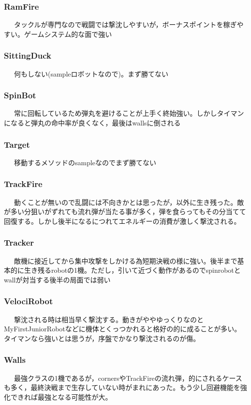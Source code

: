 \documentclass[12pt]{jarticle} %
\begin{document}
\begin{flushleft}
 \subsubsection{RamFire}
 \ \ \ タックルが専門なので戦闘では撃沈しやすいが，ボーナスポイントを稼ぎやすい。ゲームシステム的な面で強い
 
 \subsubsection{SittingDuck}
 \ \ \ 何もしない(sampleロボットなので)。まず勝てない
 
 \subsubsection{SpinBot}
 \ \ \ 常に回転しているため弾丸を避けることが上手く終始強い。しかしタイマンになると弾丸の命中率が良くなく，最後はwallsに倒される
 
 \subsubsection{Target}
 \ \ \ 移動するメソッドのsampleなのでまず勝てない
 
 \subsubsection{TrackFire}
 \ \ \ 動くことが無いので乱闘には不向きかとは思ったが，以外に生き残った。敵が多い分狙いがずれても流れ弾が当たる事が多く，弾を食らってもその分当てて回復する。しかし後半になるにつれてエネルギーの消費が激しく撃沈される。
 
 \subsubsection{Tracker}
 \ \ \ 敵機に接近してから集中攻撃をしかける為短期決戦の様に強い。後半まで基本的に生き残るrobotの1機。ただし，引いて近づく動作があるのでspinrobotとwallが対当する後半の局面では弱い
 
 \subsubsection{VelociRobot}
 \ \ \ 撃沈される時は相当早く撃沈する。動きがややゆっくりなのとMyFirstJuniorRobotなどに機体とくっつかれると格好の的に成ることが多い。タイマンなら強いとは思うが，序盤でかなり撃沈されるのが傷。
 
 \subsubsection{Walls}
 \ \ \ 最強クラスの1機であるが，cornersやTrackFireの流れ弾，的にされるケースも多く，最終決戦まで生存していない時がまれにあった。もう少し回避機能を強化できれば最強となる可能性が大。


\end{flushleft}
\end{document}

